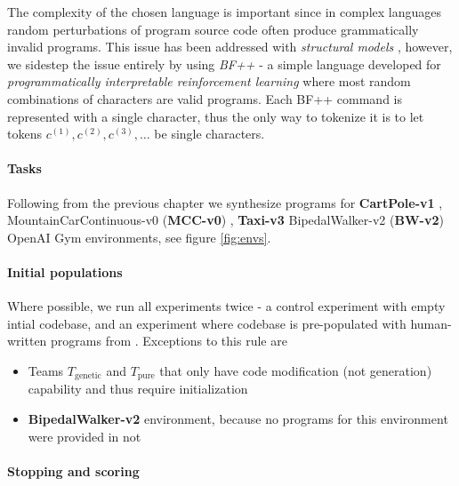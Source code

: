 
The complexity of the chosen language is important since in complex languages random perturbations of program source code often produce grammatically invalid programs.
This issue has been addressed with \emph{structural models} \cite{grammargp,structural} \cite[chapter 4]{genprog1,genprog2ast}, however, we sidestep the issue entirely by using \emph{BF++} \cite{bf++} - a simple language developed for \emph{programmatically interpretable reinforcement learning} where most random combinations of characters are valid programs.
Each BF++ command is represented with a single character, thus the only way to tokenize it is to let tokens $c^{(1)},c^{(2)},c^{(3)},\dots$ be single characters.

\paragraph{Tasks}
\label{sec:tasks}

Following from the previous chapter we synthesize programs for \textbf{CartPole-v1} \cite{cartpole}, MountainCarContinuous-v0 (\textbf{MCC-v0}) \cite{mountain_car}, \textbf{Taxi-v3} \cite{taxi} BipedalWalker-v2 (\textbf{BW-v2})  OpenAI Gym \cite{openai-gym} environments, see figure \ref{fig:envs}.

\paragraph{Initial populations}

Where possible, we run all experiments twice - a control experiment with empty intial codebase, and an experiment where codebase is pre-populated with human-written programs from \cite{bf++}.
Exceptions to this rule are 
\begin{itemize}
    \item Teams $T_\text{genetic}$ and $T_\text{pure}$ that only have code modification (not generation) capability and thus require initialization 
    \item \textbf{BipedalWalker-v2} environment, because no programs for this environment were provided in \cite{bf++} not 
\end{itemize}

\paragraph{Stopping and scoring}

